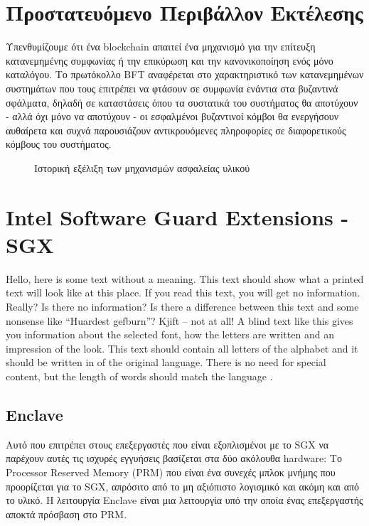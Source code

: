 \section{Προστατευόμενο Περιβάλλον Εκτέλεσης}
Υπενθυμίζουμε ότι ένα blockchain απαιτεί ένα μηχανισμό για την επίτευξη κατανεμημένης συμφωνίας ή την επικύρωση και την κανονικοποίηση ενός μόνο καταλόγου. Το πρωτόκολλο BFT αναφέρεται στο χαρακτηριστικό των κατανεμημένων συστημάτων που τους επιτρέπει να φτάσουν σε συμφωνία ενάντια στα βυζαντινά σφάλματα, δηλαδή σε καταστάσεις όπου τα συστατικά του συστήματος θα αποτύχουν - αλλά όχι μόνο να αποτύχουν - οι εσφαλμένοι βυζαντινοί κόμβοι θα ενεργήσουν αυθαίρετα και συχνά παρουσιάζουν αντικρουόμενες πληροφορίες σε διαφορετικούς κόμβους του συστήματος.



\begin{figure}[h]
    \vspace*{-2cm}
\caption{Ιστορική εξέλιξη των μηχανισμών ασφαλείας υλικού}
\end{figure}


\section{Intel Software Guard Extensions - SGX}
Hello, here is some text without a meaning. This text should show what a printed text
will look like at this place. If you read this text, you will get no information. Really? Is there
no information? Is there a difference between this text and some nonsense like “Huardest
gefburn”? Kjift – not at all! A blind text like this gives you information about the selected
font, how the letters are written and an impression of the look. This text should contain
all letters of the alphabet and it should be written in of the original language. There is no
need for special content, but the length of words should match the language \cite{teeintro}.



\subsection{Enclave}
Αυτό που επιτρέπει στους επεξεργαστές που είναι εξοπλισμένοι με το SGX να παρέχουν αυτές τις ισχυρές εγγυήσεις βασίζεται στα δύο ακόλουθα hardware: Το Processor Reserved Memory (PRM) που είναι ένα συνεχές μπλοκ μνήμης που προορίζεται για το SGX, απρόσιτο από το μη αξιόπιστο λογισμικό και ακόμη και από το υλικό. Η λειτουργία Enclave είναι μια λειτουργία υπό την οποία ένας επεξεργαστής αποκτά πρόσβαση στο PRM.

